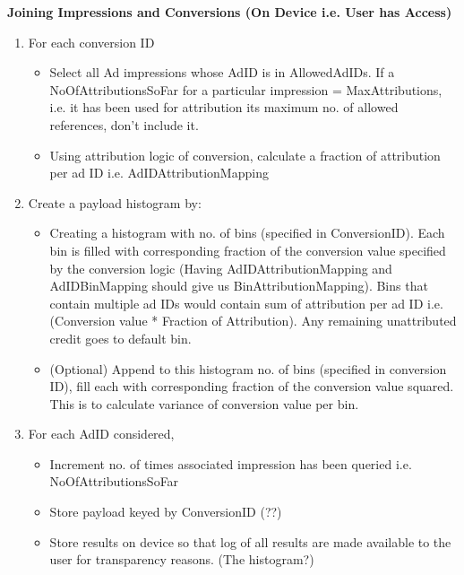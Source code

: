 \textbf{Joining Impressions and Conversions (On Device i.e. User has Access)}
\begin{enumerate}
   \item For each conversion ID
    \begin{itemize}
        \item Select all Ad impressions whose AdID is in AllowedAdIDs. If a NoOfAttributionsSoFar for a particular impression = MaxAttributions, i.e. it has been used for attribution its maximum no. of allowed references, don't include it.
        \item Using attribution logic of conversion, calculate a fraction of attribution per ad ID i.e. AdIDAttributionMapping
    \end{itemize}
   \item Create a payload histogram by: 
    \begin{itemize}
        \item Creating a histogram with no. of bins (specified in ConversionID). Each bin is filled with corresponding fraction of the conversion value specified by the conversion logic (Having AdIDAttributionMapping and AdIDBinMapping should give us BinAttributionMapping). Bins that contain multiple ad IDs would contain sum of attribution per ad ID i.e. (Conversion value * Fraction of Attribution). Any remaining unattributed credit goes to default bin.
        \item (Optional) Append to this histogram no. of bins (specified in conversion ID), fill each with corresponding fraction of the conversion value squared. This is to calculate variance of conversion value per bin.
    \end{itemize}
    \item For each AdID considered,
    \begin{itemize}
        \item Increment no. of times associated impression has been queried i.e. NoOfAttributionsSoFar
        \item Store payload keyed by ConversionID (??)
        \item Store results on device so that log of all results are made available to the user for transparency reasons. (The histogram?)
    \end{itemize}
\end{enumerate}

